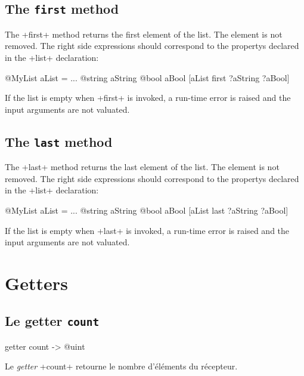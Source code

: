 \subsection{The \texttt{first} method}

The \ggs+first+ method returns the first element of the list. The element is not removed. The right side expressions should correspond to the propertys declared in the \ggs+list+ declaration:

\begin{galgas}
@MyList aList = ...
@string aString
@bool aBool
[aList first ?aString ?aBool]
\end{galgas}

If the list is empty when \ggs+first+ is invoked, a run-time error is raised and the input arguments are not valuated.

\subsection{The \texttt{last} method}

The \ggs+last+ method returns the last element of the list. The element is not removed. The right side expressions should correspond to the propertys declared in the \ggs+list+ declaration:\\

\begin{galgas}
@MyList aList = ...
@string aString
@bool aBool
[aList last ?aString ?aBool]
\end{galgas}


If the list is empty when \ggs+last+ is invoked, a run-time error is raised and the input arguments are not valuated.








\section{Getters}

\subsection{Le getter \texttt{count}}

\begin{galgas}
getter count -> @uint
\end{galgas}

Le \emph{getter} \ggs+count+ retourne le nombre d'éléments du récepteur.



